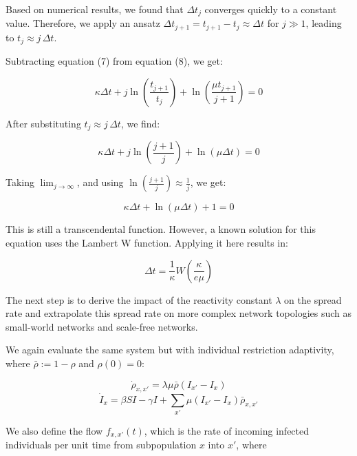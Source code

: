 \documentclass{article}
\begin{document}
Based on numerical results, we found that ${\Delta t}_{j}$ converges quickly to a constant value. Therefore, we apply an ansatz ${\Delta t}_{j+1} = t_{j+1} - t_j \approx {\Delta t}$ for $j \gg 1$, leading to $t_j \approx j \, \Delta t$.

Subtracting equation (7) from equation (8), we get:

\begin{equation}
\kappa \Delta t + j \ln\left( \frac{t_{j+1}}{t_j} \right) + \ln\left( \frac{\mu t_{j+1}}{j+1} \right) = 0
\end{equation}

After substituting $t_j \approx j \, \Delta t$, we find:

\begin{equation}
\kappa \Delta t + j \ln\left( \frac{j+1}{j} \right) + \ln\left( \mu \Delta t \right) = 0 
\end{equation}

Taking $\lim_{j \to \infty}$, and using $\ln\left( \frac{{j+1}}{j} \right) \approx \frac{1}{j}$, we get:

\begin{equation}
\kappa \Delta t + \ln( \mu \Delta t ) + 1 = 0
\end{equation}

This is still a transcendental function. However, a known solution for this equation uses the Lambert W function. Applying it here results in:

\begin{equation}
\Delta t = \frac{1}{\kappa} W\left(\frac{\kappa}{e \mu}\right)
\end{equation}

The next step is to derive the impact of the reactivity constant $\lambda$ on the spread rate and extrapolate this spread rate on more complex network topologies such as small-world networks and scale-free networks.

We again evaluate the same system but with individual restriction adaptivity, where $\bar \rho := 1 - \rho$ and $\rho(0) = 0$:

\begin{equation}
\dot \rho_{x,x'} = \lambda \mu \bar \rho (I_{x'} - I_x)
\end{equation}
\begin{equation}
\dot I_x = \beta S I - \gamma I +  \sum_{x'} \mu (I_{x'} - I_x) \bar \rho_{x,x'}
\end{equation}

We also define the flow $f_{x,x'}(t)$, which is the rate of incoming infected individuals per unit time from subpopulation $x$ into $x'$, where 
\end{document}

